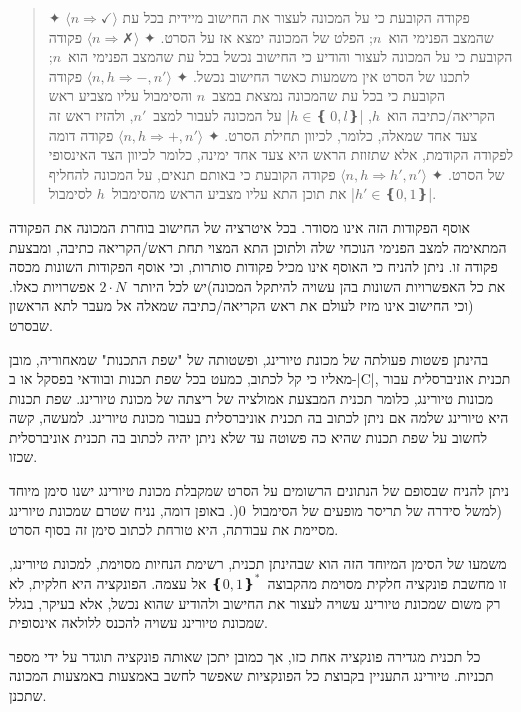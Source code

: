 \begin{quote}
\begin{enumerate}
  ✦ $⟨n⇒✓⟩$ פקודה הקובעת כי על המכונה לעצור את החישוב מיידית בכל עת שהמצב
  הפנימי הוא~$n$; הפלט של המכונה ימצא אז על הסרט.
  ✦ $⟨n⇒ ✗⟩$ פקודה הקובעת כי על המכונה לעצור והודיע כי החישוב נכשל בכל עת
    שהמצב הפנימי הוא~$n$; לתכנו של הסרט אין משמעות כאשר החישוב נכשל.
  ✦ $⟨n, h⇒-, n'⟩$ פקודה הקובעת כי בכל עת שהמכונה נמצאת במצב~$n$
    והסימבול עליו מצביע ראש הקריאה/כתיבה הוא~$h$, \E|$h∈❴~0,l❵$| על המכונה
    לעבור למצב~$n'$, ולהזיז ראש זה צעד אחד שמאלה, כלומר, לכיוון תחילת הסרט.
  ✦ $⟨n,h⇒+, n'⟩$ פקודה דומה לפקודה הקודמת, אלא שתזוזת הראש היא
    צעד אחד ימינה, כלומר לכיוון הצד האינסופי של הסרט.
  ✦ $⟨n,h⇒ h', n'⟩$ פקודה הקובעת כי באותם תנאים, על המכונה להחליף את תוכן התא
  עליו מצביע הראש מהסימבול~$h$ לסימבול \E|$h'∈❴0,1❵$|.
\end{enumerate}
\end{quote}

אוסף הפקודות הזה אינו מסודר. בכל איטרציה של החישוב בוחרת המכונה את הפקודה
המתאימה למצב הפנימי הנוכחי שלה ולתוכן התא המצוי תחת ראש/הקריאה כתיבה, ומבצעת
פקודה זו. ניתן להניח כי האוסף אינו מכיל פקודות סותרות, וכי אוסף הפקודות השונות
מכסה את כל האפשרויות השונות בהן עשויה להיתקל המכונה)יש לכל היותר~$2·N$
אפשרויות כאלו.(וכי החישוב אינו מזיז לעולם את ראש הקריאה/כתיבה שמאלה אל מעבר
לתא הראשון שבסרט.

בהינתן פשטות פעולתה של מכונת טיורינג, ופשטותה של "שפת התכנות" שמאחוריה, מובן
מאליו כי קל לכתוב, כמעט בכל שפת תכנות ובוודאי בפסקל או ב-\E|C|, תכנית
אוניברסלית עבור מכונות טיורינג, כלומר תכנית המבצעת אמולציה של ריצתה של מכונת
טיורינג. שפת תכנות היא טיורינג שלמה אם ניתן לכתוב בה תכנית אוניברסלית בעבור
מכונת טיורינג. למעשה, קשה לחשוב על שפת תכנות שהיא כה פשוטה עד שלא ניתן יהיה
לכתוב בה תכנית אוניברסלית שכזו.

ניתן להניח שבסופם של הנתונים הרשומים על הסרט שמקבלת מכונת טיורינג ישנו סימן
מיוחד (למשל סידרה של תריסר מופעים של הסימבול~$0$(. באופן דומה, נניח שטרם שמכונת
טיורינג מסיימת את עבודתה, היא טורחת לכתוב סימן זה בסוף הסרט.

משמעו של הסימן המיוחד הזה הוא שבהינתן תכנית, רשימת הנחיות מסוימת, למכונת
טיורינג, זו מחשבת פונקציה חלקית מסוימת מהקבוצה~$❴0,1❵^*$ אל עצמה. הפונקציה
היא חלקית, לא רק משום שמכונת טיורינג עשויה לעצור את החישוב ולהודיע שהוא נכשל,
אלא בעיקר, בגלל שמכונת טיורינג עשויה להכנס ללולאה אינסופית.

כל תכנית מגדירה פונקציה אחת כזו, אך כמובן יתכן שאותה פונקציה תוגדר על ידי מספר
תכניות. טיורינג התעניין בקבוצת כל הפונקציות שאפשר לחשב באמצעות באמצעות המכונה
שתכנן.

